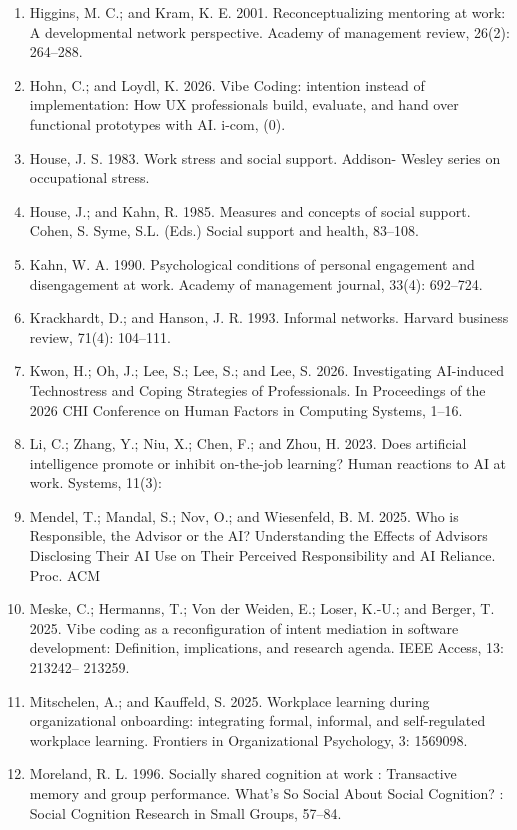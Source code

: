 \documentclass[11pt]{article}
\begin{document}
\begin{enumerate}[leftmargin=*]
  \item Higgins, M. C.; and Kram, K. E. 2001. Reconceptualizing mentoring at work: A developmental network perspective. Academy of management review, 26(2): 264–288.
  \item Hohn, C.; and Loydl, K. 2026. Vibe Coding: intention instead of implementation: How UX professionals build, evaluate, and hand over functional prototypes with AI. i-com, (0).
  \item House, J. S. 1983. Work stress and social support. Addison- Wesley series on occupational stress.
  \item House, J.; and Kahn, R. 1985. Measures and concepts of social support. Cohen, S. Syme, S.L. (Eds.) Social support and health, 83–108.
  \item Kahn, W. A. 1990. Psychological conditions of personal engagement and disengagement at work. Academy of management journal, 33(4): 692–724.
  \item Krackhardt, D.; and Hanson, J. R. 1993. Informal networks. Harvard business review, 71(4): 104–111.
  \item Kwon, H.; Oh, J.; Lee, S.; Lee, S.; and Lee, S. 2026. Investigating AI-induced Technostress and Coping Strategies of Professionals. In Proceedings of the 2026 CHI Conference on Human Factors in Computing Systems, 1–16.
  \item Li, C.; Zhang, Y.; Niu, X.; Chen, F.; and Zhou, H. 2023. Does artificial intelligence promote or inhibit on-the-job learning? Human reactions to AI at work. Systems, 11(3):
  \item Mendel, T.; Mandal, S.; Nov, O.; and Wiesenfeld, B. M. 2025. Who is Responsible, the Advisor or the AI? Understanding the Effects of Advisors Disclosing Their AI Use on Their Perceived Responsibility and AI Reliance. Proc. ACM
  \item Meske, C.; Hermanns, T.; Von der Weiden, E.; Loser, K.-U.; and Berger, T. 2025. Vibe coding as a reconfiguration of intent mediation in software development: Definition, implications, and research agenda. IEEE Access, 13: 213242– 213259.
  \item Mitschelen, A.; and Kauffeld, S. 2025. Workplace learning during organizational onboarding: integrating formal, informal, and self-regulated workplace learning. Frontiers in Organizational Psychology, 3: 1569098.
  \item Moreland, R. L. 1996. Socially shared cognition at work : Transactive memory and group performance. What’s So Social About Social Cognition? : Social Cognition Research in Small Groups, 57–84.

\end{enumerate}
\end{document}
